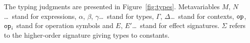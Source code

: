 The typing judgments are presented in Figure~\ref{fig:types}. Metavariables
$M$, $N$\ldots\ stand for expressions, $\alpha$, $\beta$,
$\gamma$\ldots\ stand for types, $\Gamma$, $\Delta$\ldots\ stand for
contexts, $\mathtt{op}$, $\mathtt{op}_i$ stand for operation symbols and $E$,
$E'$\ldots\ stand for effect signatures. $\Sigma$ refers to the
higher-order signature giving types to constants.

\newcommand{\handlerrule}{
 \begin{prooftree}
  \AxiomC{$E = \{\typedopg{\op{op}_i}{\alpha_i}{\beta_i}\}_{i \in I} \uplus E_f$}
  \noLine
  \def\extraVskip{0pt}
  \UnaryInfC{$E' = E'' \uplus E_f$}
  \noLine
  \UnaryInfC{$[\Gamma \vdash M_i : \alpha_i \to (\beta_i \to
    \FF_{E'}(\delta)) \to \FF_{E'}(\delta)]_{i \in I}$}
  \noLine
  \UnaryInfC{$\Gamma \vdash M_\eta : \gamma \to \FF_{E'}(\delta)$}
  \noLine
  \UnaryInfC{$\Gamma \vdash N : \FF_{E}(\gamma)$}
  \def\extraVskip{2pt}
  \RightLabel{[$\banana{}$]}
  \UnaryInfC{$\Gamma \vdash \ap{\cibanana}{N} : \FF_{E'}(\delta)$}
 \end{prooftree}}

